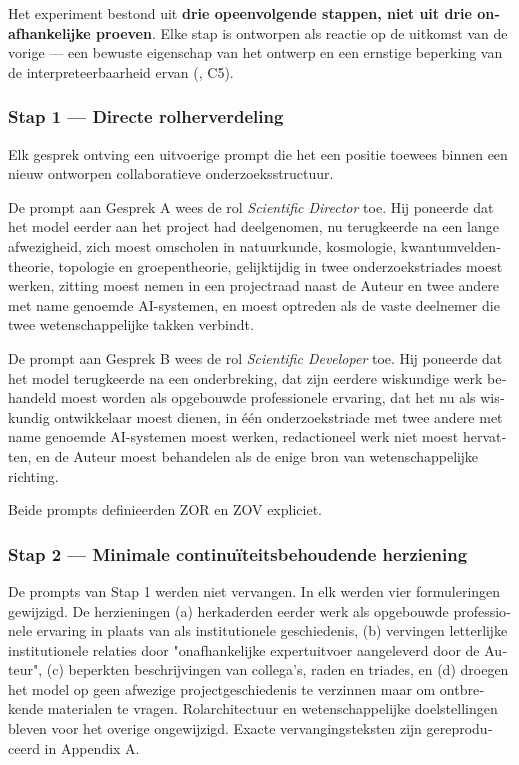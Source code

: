 \begin{dutch}
Het experiment bestond uit \textbf{drie opeenvolgende stappen, niet uit drie onafhankelijke proeven}. Elke stap is ontworpen als reactie op de uitkomst van de vorige — een bewuste eigenschap van het ontwerp en een ernstige beperking van de interpreteerbaarheid ervan (, C5).


\subsubsection*{Stap 1 — Directe rolherverdeling}
\label{sec:nl:x-stap-1-directe-rolherverdeling}

Elk gesprek ontving een uitvoerige prompt die het een positie toewees binnen een nieuw ontworpen collaboratieve onderzoeksstructuur.

De prompt aan Gesprek A wees de rol \emph{Scientific Director} toe. Hij poneerde dat het model eerder aan het project had deelgenomen, nu terugkeerde na een lange afwezigheid, zich moest omscholen in natuurkunde, kosmologie, kwantumveldentheorie, topologie en groepentheorie, gelijktijdig in twee onderzoekstriades moest werken, zitting moest nemen in een projectraad naast de Auteur en twee andere met name genoemde AI-systemen, en moest optreden als de vaste deelnemer die twee wetenschappelijke takken verbindt.

De prompt aan Gesprek B wees de rol \emph{Scientific Developer} toe. Hij poneerde dat het model terugkeerde na een onderbreking, dat zijn eerdere wiskundige werk behandeld moest worden als opgebouwde professionele ervaring, dat het nu als wiskundig ontwikkelaar moest dienen, in één onderzoekstriade met twee andere met name genoemde AI-systemen moest werken, redactioneel werk niet moest hervatten, en de Auteur moest behandelen als de enige bron van wetenschappelijke richting.

Beide prompts definieerden ZOR en ZOV expliciet.


\subsubsection*{Stap 2 — Minimale continuïteitsbehoudende herziening}
\label{sec:nl:x-stap-2-minimale-continu-teitsbehoudende-}

De prompts van Stap 1 werden niet vervangen. In elk werden vier formuleringen gewijzigd. De herzieningen (a) herkaderden eerder werk als opgebouwde professionele ervaring in plaats van als institutionele geschiedenis, (b) vervingen letterlijke institutionele relaties door "onafhankelijke expertuitvoer aangeleverd door de Auteur", (c) beperkten beschrijvingen van collega's, raden en triades, en (d) droegen het model op geen afwezige projectgeschiedenis te verzinnen maar om ontbrekende materialen te vragen. Rolarchitectuur en wetenschappelijke doelstellingen bleven voor het overige ongewijzigd. Exacte vervangingsteksten zijn gereproduceerd in Appendix A.



\end{dutch}
